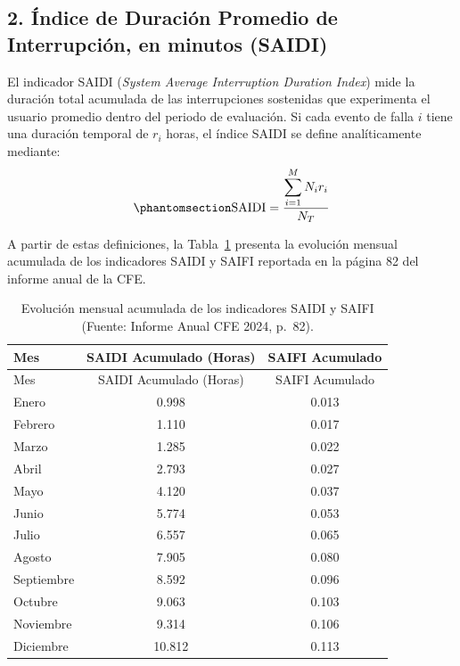 \documentclass[
  spanish,
  us-letterpaper,
]{scrreprt}
\numberwithin{equation}{section}
\theoremstyle{plain}
\theoremstyle{plain}
\theoremstyle{definition}
\theoremstyle{plain}
\theoremstyle{remark}
\begin{document}
\subsection{2. Índice de Duración Promedio de Interrupción, en minutos
(SAIDI)}\label{uxedndice-de-duraciuxf3n-promedio-de-interrupciuxf3n-en-minutos-saidi}

El indicador SAIDI (\emph{System Average Interruption Duration Index})
mide la duración total acumulada de las interrupciones sostenidas que
experimenta el usuario promedio dentro del periodo de evaluación. Si
cada evento de falla \(i\) tiene una duración temporal de \(r_i\) horas,
el índice SAIDI se define analíticamente mediante:
\begin{equation}\phantomsection\label{eq-saidi}{
\displaystyle \text{SAIDI} = \displaystyle \dfrac{\displaystyle \sum_{i=1}^{M} N_i r_i}{N_T}
}\end{equation}

A partir de estas definiciones, la Tabla~\ref{tbl-saidi-saifi} presenta
la evolución mensual acumulada de los indicadores SAIDI y SAIFI
reportada en la página 82 del informe anual de la CFE.

\begin{longtable}[]{@{}lcc@{}}
\caption{Evolución mensual acumulada de los indicadores SAIDI y SAIFI
(Fuente: Informe Anual CFE 2024,
p.~82).}\label{tbl-saidi-saifi}\tabularnewline
\toprule\noalign{}
Mes & SAIDI Acumulado (Horas) & SAIFI Acumulado \\
\midrule\noalign{}
\endfirsthead
\toprule\noalign{}
Mes & SAIDI Acumulado (Horas) & SAIFI Acumulado \\
\midrule\noalign{}
\endhead
\bottomrule\noalign{}
\endlastfoot
Enero & 0.998 & 0.013 \\
Febrero & 1.110 & 0.017 \\
Marzo & 1.285 & 0.022 \\
Abril & 2.793 & 0.027 \\
Mayo & 4.120 & 0.037 \\
Junio & 5.774 & 0.053 \\
Julio & 6.557 & 0.065 \\
Agosto & 7.905 & 0.080 \\
Septiembre & 8.592 & 0.096 \\
Octubre & 9.063 & 0.103 \\
Noviembre & 9.314 & 0.106 \\
Diciembre & 10.812 & 0.113 \\
\end{longtable}
\end{document}

